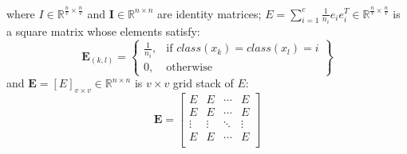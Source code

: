 \begin{appendix}
\begin{equation}
\begin{split}
        \end{split}
        \label{eq:mvda_Sw_derivation}
    \end{equation}
    where $I \in \mathbb{R}^{\frac{n}{v}\times \frac{n}{v}}$ and $\boldsymbol{I} \in \mathbb{R}^{n\times n}$ are identity matrices; $E = \sum_{i=1}^{c}\frac{1}{n_i}e_i e_i^T \in \mathbb{R}^{\frac{n}{v}\times \frac{n}{v}}$ is a square matrix whose elements satisfy:
    \begin{equation}
        \boldsymbol{E}_{(k,l)} = \left\{\begin{array}{lr}
            \frac{1}{n_i}, & \text{if } class(x_k) = class(x_l) = i\\
            0, & \text{otherwise}
            \end{array}\right\}
    \end{equation}
    and $\boldsymbol{E} = \left[E\right]_{v\times v} \in \mathbb{R}^{n\times n}$ is $v \times v$ grid stack of $E$:
    \begin{equation}
        \boldsymbol{E} = \left[\begin{matrix}E&E&\cdots&E\\E&E&\cdots&E\\\vdots&\vdots&\ddots&\vdots\\E&E&\cdots&E\\\end{matrix}\right]
    \end{equation}


\end{appendix}
